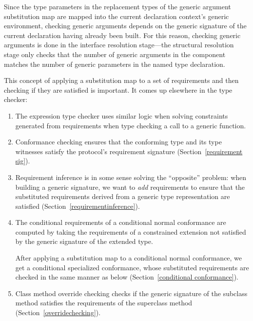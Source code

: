 \documentclass[../generics]{subfiles}
\begin{document}
Since the type parameters in the replacement types of the generic argument substitution map are mapped into the current declaration context's generic environment, checking generic arguments depends on the generic signature of the current declaration having already been built. For this reason, checking generic arguments is done in the interface resolution stage---the structural resolution stage only checks that the number of generic arguments in the component matches the number of generic parameters in the named type declaration.

This concept of applying a substitution map to a set of requirements and then checking if they are satisfied is important. It comes up elsewhere in the type checker:
\begin{enumerate}
\item The expression type checker uses similar logic when solving constraints generated from requirements when type checking a call to a generic function.
\item Conformance checking ensures that the conforming type and its type witnesses satisfy the protocol's requirement signature (Section~\ref{requirement sig}).
\item Requirement inference is in some sense solving the ``opposite'' problem: when building a generic signature, we want to \emph{add} requirements to ensure that the substituted requirements derived from a generic type representation are satisfied (Section~\ref{requirementinference}).
\item The conditional requirements of a conditional normal conformance are computed by taking the requirements of a constrained extension not satisfied by the generic signature of the extended type.

After applying a substitution map to a conditional normal conformance, we get a conditional specialized conformance, whose substituted requirements are checked in the same manner as below (Section~\ref{conditional conformance}).
\item Class method override checking checks if the generic signature of the subclass method satisfies the requirements of the superclass method (Section~\ref{overridechecking}).
\end{enumerate}
\end{document}
